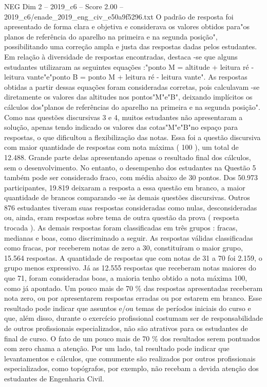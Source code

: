 \begin{textsample}{NEG Dim 2 – 2019\_c6 – Score 2.00 – 2019\_c6/enade\_2019\_eng\_civ\_e50a9f5296.txt}
O padrão de resposta foi apresentado de forma clara e objetiva e considerava os valores obtidos para"os planos de referência do aparelho na primeira e na segunda posição", possibilitando uma correção ampla e justa das respostas dadas pelos estudantes.
Em relação à diversidade de respostas encontradas, destaca -se que alguns estudantes utilizaram as seguintes equações :"ponto M = altitude + leitura ré - leitura vante"e"ponto B = ponto M + leitura ré - leitura vante".
As respostas obtidas a partir dessas equações foram consideradas corretas, pois calculavam -se diretamente os valores das altitudes nos pontos"M"e"B", deixando implícitos os cálculos dos"planos de referências do aparelho na primeira e na segunda posição".
Como nas questões discursivas 3 e 4, muitos estudantes não apresentaram a solução, apenas tendo indicado os valores das cotas"M"e"B"no espaço para respostas, o que dificultou a flexibilização das notas.
Essa foi a questão discursiva com maior quantidade de respostas com nota máxima ( 100 ), um total de 12.488.
Grande parte delas apresentando apenas o resultado final dos cálculos, sem o desenvolvimento.
No entanto, o desempenho dos estudantes na Questão 5 também pode ser considerado fraco, com média abaixo de 30 pontos.
Dos 50.973 participantes, 19.819 deixaram a resposta a essa questão em branco, a maior quantidade de brancos comparando -se às demais questões discursivas.
Outros 876 estudantes tiveram suas respostas consideradas como nulas, desconsideradas ou, ainda, eram respostas sobre tema de outra questão da prova ( resposta trocada ).
As demais respostas foram classificadas em três grupos : fracas, medianas e boas, como discriminado a seguir.
As respostas válidas classificadas como fracas, por receberem notas de zero a 30, constituíram o maior grupo, 15.564 respostas.
A quantidade de respostas que com notas de 31 a 70 foi 2.159, o grupo menos expressivo.
Já as 12.555 respostas que receberam notas maiores do que 71, foram consideradas boas, a maioria tenho obtido a nota máxima 100, como já apontado.
Um pouco mais de 70 \% das respostas apresentadas receberam nota zero, ou por apresentarem respostas erradas ou por estarem em branco.
Esse resultado pode indicar que assuntos e/ou temas de períodos iniciais do curso e que, além disso, durante o exercício profissional costumam ser de responsabilidade de outros profissionais especializados, não são atrativos para os estudantes de final de curso.
O fato de um pouco mais de 70 \% dos resultados serem pontuados com zero chama a atenção.
Por um lado, tal resultado pode indicar que levantamentos e cálculos, que comumente são realizados por outros profissionais especializados, como topógrafos, por exemplo, não recebam a devida atenção dos estudantes de Engenharia Civil.

\end{textsample}
